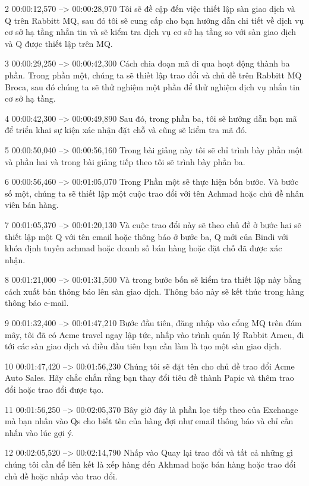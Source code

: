 2
00:00:12,570 --> 00:00:28,970
Tôi sẽ đề cập đến việc thiết lập sàn giao dịch và Q trên Rabbitt MQ, sau đó tôi sẽ cung cấp cho bạn hướng dẫn chi tiết về dịch vụ cơ sở hạ tầng nhắn tin và sẽ kiểm tra dịch vụ cơ sở hạ tầng so với sàn giao dịch và Q được thiết lập trên MQ.

3
00:00:29,250 --> 00:00:42,300
Cách chia đoạn mã đi qua hoạt động thành ba phần.  Trong phần một, chúng ta sẽ thiết lập trao đổi và chủ đề trên Rabbitt MQ Broca, sau đó chúng ta sẽ thử nghiệm một phần để thử nghiệm dịch vụ nhắn tin cơ sở hạ tầng.

4
00:00:42,300 --> 00:00:49,890
Sau đó, trong phần ba, tôi sẽ hướng dẫn bạn mã để triển khai sự kiện xác nhận đặt chỗ và cũng sẽ kiểm tra mã đó.

5
00:00:50,040 --> 00:00:56,160
Trong bài giảng này tôi sẽ chỉ trình bày phần một và phần hai và trong bài giảng tiếp theo tôi sẽ trình bày phần ba.

6
00:00:56,460 --> 00:01:05,070
Trong Phần một sẽ thực hiện bốn bước.  Và bước số một, chúng ta sẽ thiết lập một cuộc trao đổi với tên Achmad hoặc chủ đề nhân viên bán hàng.

7
00:01:05,370 --> 00:01:20,130
Và cuộc trao đổi này sẽ theo chủ đề ở bước hai sẽ thiết lập một Q với tên email hoặc thông báo ở bước ba, Q mới của Bindi với khóa định tuyến achmad hoặc doanh số bán hàng hoặc đặt chỗ đã được xác nhận.

8
00:01:21,000 --> 00:01:31,500
Và trong bước bốn sẽ kiểm tra thiết lập này bằng cách xuất bản thông báo lên sàn giao dịch.  Thông báo này sẽ kết thúc trong hàng thông báo e-mail.

9
00:01:32,400 --> 00:01:47,210
Bước đầu tiên, đăng nhập vào cổng MQ trên đám mây, tôi đã có Acme travel ngay lập tức, nhấp vào trình quản lý Rabbit Amcu, đi tới các sàn giao dịch và điều đầu tiên bạn cần làm là tạo một sàn giao dịch.

10
00:01:47,420 --> 00:01:56,230
Chúng tôi sẽ đặt tên cho chủ đề trao đổi Acme Auto Sales.  Hãy chắc chắn rằng bạn thay đổi tiêu đề thành Papic và thêm trao đổi hoặc trao đổi được tạo.

11
00:01:56,250 --> 00:02:05,370
Bây giờ đây là phần lọc tiếp theo của Exchange mà bạn nhấn vào Qs cho biết tên của hàng đợi như email thông báo và chỉ cần nhấn vào lúc gợi ý.

12
00:02:05,520 --> 00:02:14,790
Nhấp vào Quay lại trao đổi và tất cả những gì chúng tôi cần để liên kết là xếp hàng đến Akhmad hoặc bán hàng hoặc trao đổi chủ đề hoặc nhấp vào trao đổi.

